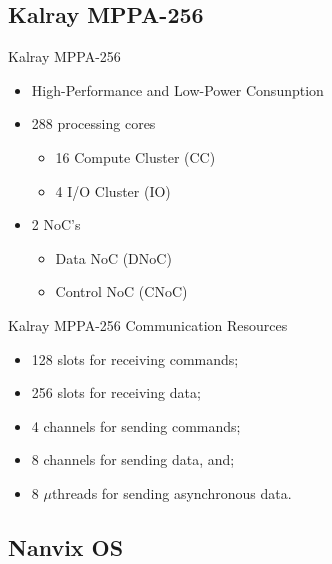 	\subsection{Kalray MPPA-256}

		\begin{frame}[fragile]{Kalray MPPA-256}
			\begin{itemize}
				\item {High-Performance and Low-Power Consunption}
				\item {288 processing cores}
				\begin{itemize}
					\item {16 Compute Cluster (CC)}
					\item {4 I/O Cluster (IO)}
				\end{itemize}
				\item {2 NoC's}
				\begin{itemize}
					\item {Data NoC (DNoC)}
					\item {Control NoC (CNoC)}
				\end{itemize}
			\end{itemize}
		\end{frame}

		\begin{frame}[fragile]{Kalray MPPA-256 Communication Resources}
			\begin{itemize}
				\item 128 slots for receiving commands;
				\item 256 slots for receiving data;
				\item 4 channels for sending commands;
				\item 8 channels for sending data, and;
				\item 8 $\mu$threads for sending asynchronous data.
			\end{itemize}
		\end{frame}

	\subsection{Nanvix OS}

